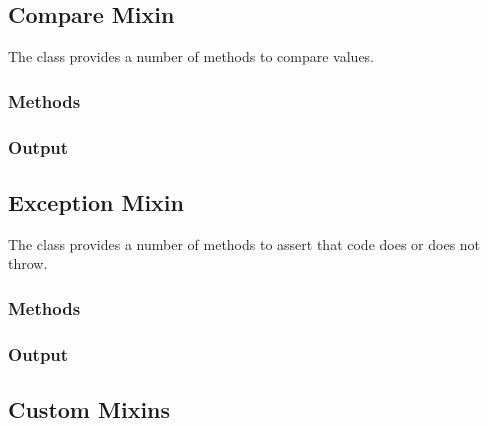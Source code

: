 \subsection{Compare Mixin}
\label{section:mixins:compare}

The  class provides a number of methods to compare values.

\subsubsection{Methods}



\subsubsection{Output}



\subsection{Exception Mixin}
\label{section:mixins:exception}

The  class provides a number of methods to assert that code does or does not throw.

\subsubsection{Methods}



\subsubsection{Output}



\subsection{Custom Mixins}
\label{section:mixins:custom}

